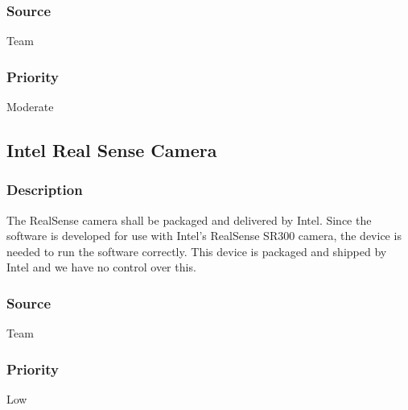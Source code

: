 \subsubsection{Source}
Team
\subsubsection{Priority}
Moderate
\subsection{Intel Real Sense Camera}
\subsubsection{Description}
The RealSense camera shall be packaged and delivered by Intel. Since the software is developed for use with Intel's RealSense SR300 camera, the device is needed to run the software correctly. This device is packaged and shipped by Intel and we have no control over this.
\subsubsection{Source}
Team
\subsubsection{Priority}
Low